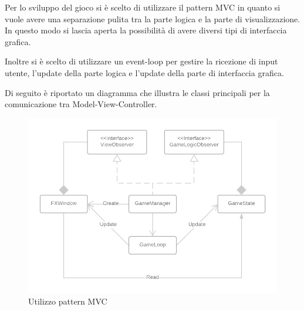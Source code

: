 Per lo sviluppo del gioco si è scelto di utilizzare il pattern MVC in quanto si vuole avere una separazione pulita tra la parte logica e la parte di visualizzazione. In questo modo si lascia aperta la possibilità di avere diversi tipi di interfaccia grafica.

Inoltre si è scelto di utilizzare un event-loop per gestire la ricezione di input utente, l'update della parte logica e l'update della parte di interfaccia grafica. 

Di seguito è riportato un diagramma che illustra le classi principali per la comunicazione tra Model-View-Controller.

\begin{figure}[H]
  \includegraphics[width=15cm]{res/MVC_Diagram.png}
  \caption{Utilizzo pattern MVC}
\end{figure}